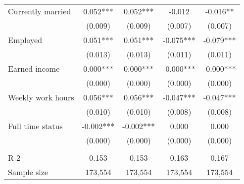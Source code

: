 \begin{tabular}{lcccc}
 Currently married   & 0.052***   & 0.052***   & -0.012   & -0.016**  \\
 & (0.009)   & (0.009)   & (0.007)   & (0.007)  \\
 Employed   & 0.051***   & 0.051***   & -0.075***   & -0.079***  \\
 & (0.013)   & (0.013)   & (0.011)   & (0.011)  \\
 Earned income   & 0.000***   & 0.000***   & -0.000***   & -0.000***  \\
 & (0.000)   & (0.000)   & (0.000)   & (0.000)  \\
 Weekly work hours   & 0.056***   & 0.056***   & -0.047***   & -0.047***  \\
 & (0.010)   & (0.010)   & (0.008)   & (0.008)  \\
 Full time status   & -0.002***   & -0.002***   & 0.000   & 0.000  \\
 & (0.000)   & (0.000)   & (0.000)   & (0.000)  \\
\\
R-2 & 0.153 & 0.153 & 0.163 & 0.167 \\
Sample size & 173,554 & 173,554 & 173,554 & 173,554 \\
\bottomrule
\bottomrule
\end{tabular}